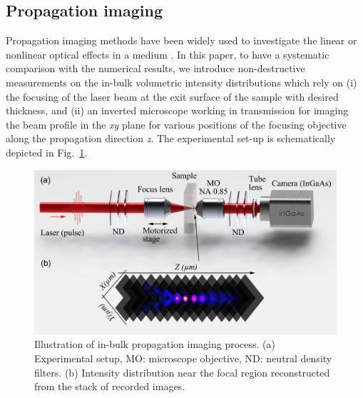 \documentclass[9pt,twocolumn,twoside]{osajnl}
\begin{document}
\subsection{ Propagation imaging}
Propagation imaging methods have been widely used to investigate the linear or nonlinear optical effects in a medium \cite{pasquier2015handling, fedorov2016accessing, wang2020ultrafast,Chambonneau2020}. In this paper, to have a systematic comparison with the numerical results, we introduce non-destructive measurements on the in-bulk volumetric intensity distributions which rely on (i) the focusing of the laser beam at the exit surface of the sample with desired thickness, and (ii) an inverted microscope working in transmission for imaging the beam profile in the \textit{xy} plane for various positions of the focusing objective along the propagation direction \textit{z}. The experimental set-up is schematically depicted in Fig.~\ref{fig:2}.
\begin{figure}
	\centering
	\includegraphics[width=\linewidth]{../AppOptics/figures/setup.pdf}
	\caption{Illustration of in-bulk propagation imaging process. (a) Experimental setup, MO: microscope objective, ND: neutral density filters. (b) Intensity distribution near the focal region reconstructed from the stack of recorded images.}\label{fig:2}
\end{figure}
\end{document}

